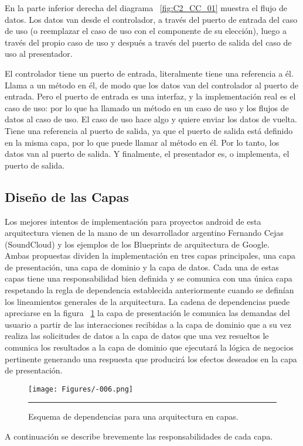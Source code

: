 En la parte inferior derecha del diagrama ~\ref{fig:C2_CC_01} muestra el flujo de datos. Los datos van desde el controlador, a través del puerto de entrada del caso de uso (o reemplazar el caso de uso con el componente de su elección), luego a través del propio caso de uso y después a través del puerto de salida del caso de uso al presentador.

El controlador tiene un puerto de entrada, literalmente tiene una referencia a él. Llama a un método en él, de modo que los datos van del controlador al puerto de entrada. Pero el puerto de entrada es una interfaz, y la implementación real es el caso de uso: por lo que ha llamado un método en un caso de uso y los flujos de datos al caso de uso. El caso de uso hace algo y quiere enviar los datos de vuelta. Tiene una referencia al puerto de salida, ya que el puerto de salida está definido en la misma capa, por lo que puede llamar al método en él. Por lo tanto, los datos van al puerto de salida. Y finalmente, el presentador es, o implementa, el puerto de salida.
\subsection{Diseño de las Capas}

Los mejores intentos de implementación para proyectos android de esta arquitectura vienen de la mano de un desarrollador argentino Fernando Cejas \cite{clean_cejas} (SoundCloud) y los ejemplos de los Blueprints de arquitectura de  Google\cite{clean_android_blueprints}.\\
Ambas propuestas dividen la implementación en tres capas principales, una capa de presentación, una capa de dominio y la capa de datos.
Cada una de estas capas tiene una responsabilidad bien definida y se comunica con una única capa respetando la regla de dependencia establecida anteriormente cuando se definían los lineamientos generales de la arquitectura.
La cadena de dependencias puede apreciarse en la figura ~\ref{fig:Diagrama_clasico2} la capa de presentación le comunica las demandas del usuario a partir de las interacciones recibidas a la capa de dominio que a su vez realiza las solicitudes de datos a la capa de datos que una vez resueltos le comunica los resultados a la capa de dominio que ejecutará la lógica de negocios pertinente generando una respuesta que producirá los efectos deseados en la capa de presentación.\\
\begin{figure}[htbp]
	\centering
	\texttt{[image: Figures/-006.png]}
	\rule{35em}{1pt}
	\caption[Dependencia de Módulos]{Esquema de dependencias para una arquitectura en capas.}
	\label{fig:Diagrama_clasico2}
\end{figure}
A continuación se describe brevemente las responsabilidades de cada capa.




